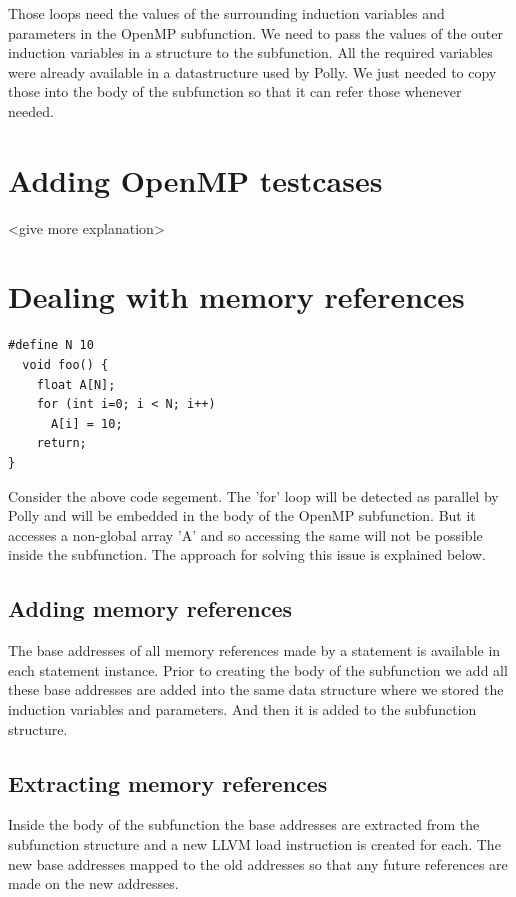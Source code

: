 Those loops need the values of the surrounding induction variables and parameters in the OpenMP subfunction. We need
to pass the values of the outer induction variables in a structure to the subfunction. All the required variables
were already available in a datastructure used by Polly. We just needed to copy those into the body of the subfunction
so that it can refer those whenever needed.

\section{Adding OpenMP testcases}

<give more explanation>

\section{Dealing with memory references}

\begin{lstlisting}
#define N 10
  void foo() {
    float A[N];
    for (int i=0; i < N; i++)
      A[i] = 10;
    return;
}
\end{lstlisting}

Consider the above code segement. The 'for' loop will be detected as parallel by Polly and will be embedded in the
body of the OpenMP subfunction. But it accesses a non-global array 'A' and so accessing the same will not be possible inside
the subfunction. The approach for solving this issue is explained below.

\subsection{Adding memory references}

The base addresses of all memory references made by a statement is available in each statement instance. Prior to creating the body
of the subfunction we add all these base addresses are added into the same data structure where we stored the induction variables and parameters.
And then it is added to the subfunction structure.

\subsection{Extracting memory references}

Inside the body of the subfunction the base addresses are extracted from the subfunction structure and a new LLVM load instruction is created for each. The
new base addresses mapped to the old addresses so that any future references are made on the new addresses.

